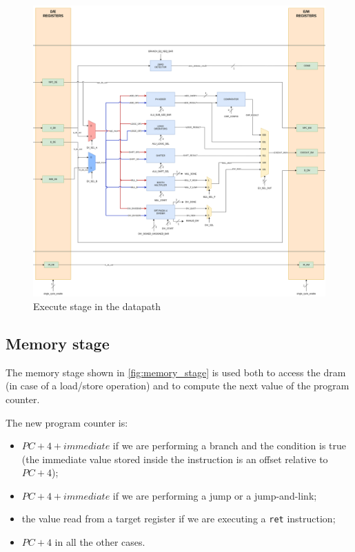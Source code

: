 \begin{figure}
    \centering
    \includegraphics[width=1\linewidth]{images/execute_stage.png}
    \caption{Execute stage in the datapath}
    \label{fig:execute_stage}
\end{figure}

\subsection{Memory stage}

The memory stage shown in \autoref{fig:memory_stage} is used both to access the dram (in case of a load/store operation) and to compute the next value of the program counter. 

The new program counter is:
\begin{itemize}
    \item $PC + 4 + immediate$ if we are performing a branch and the condition is true (the immediate value stored inside the instruction is an offset relative to $PC + 4$);
    \item $PC + 4 + immediate$ if we are performing a jump or a jump-and-link;
    \item the value read from a target register if we are executing a \texttt{ret} instruction;
    \item $PC + 4$ in all the other cases.
\end{itemize}

